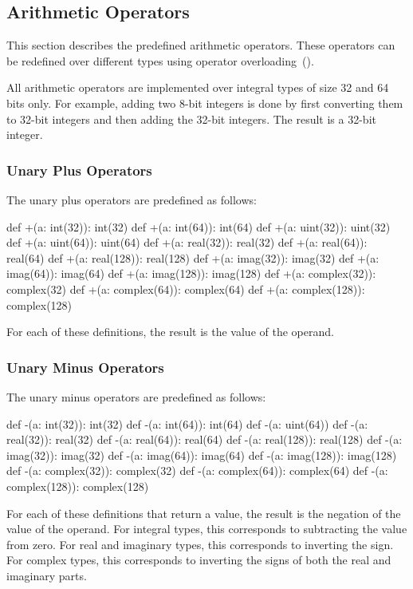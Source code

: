 \subsection{Arithmetic Operators}
\label{Arithmetic_Operators}

This section describes the predefined arithmetic operators.  These
operators can be redefined over different types using operator
overloading~().

All arithmetic operators are implemented over integral types of size
32 and 64 bits only.  For example, adding two 8-bit integers is done
by first converting them to 32-bit integers and then adding the 32-bit
integers.  The result is a 32-bit integer.

\subsubsection{Unary Plus Operators}
\label{Unary_Plus_Operators}

The unary plus operators are predefined as follows:
\begin{chapel}
def +(a: int(32)): int(32)
def +(a: int(64)): int(64)
def +(a: uint(32)): uint(32)
def +(a: uint(64)): uint(64)
def +(a: real(32)): real(32)
def +(a: real(64)): real(64)
def +(a: real(128)): real(128)
def +(a: imag(32)): imag(32)
def +(a: imag(64)): imag(64)
def +(a: imag(128)): imag(128)
def +(a: complex(32)): complex(32)
def +(a: complex(64)): complex(64)
def +(a: complex(128)): complex(128)
\end{chapel}
For each of these definitions, the result is the value of the operand.

\subsubsection{Unary Minus Operators}
\label{Unary_Minus_Operators}

The unary minus operators are predefined as follows:
\begin{chapel}
def -(a: int(32)): int(32)
def -(a: int(64)): int(64)
def -(a: uint(64))
def -(a: real(32)): real(32)
def -(a: real(64)): real(64)
def -(a: real(128)): real(128)
def -(a: imag(32)): imag(32)
def -(a: imag(64)): imag(64)
def -(a: imag(128)): imag(128)
def -(a: complex(32)): complex(32)
def -(a: complex(64)): complex(64)
def -(a: complex(128)): complex(128)
\end{chapel}
For each of these definitions that return a value, the result is the
negation of the value of the operand.  For integral types, this
corresponds to subtracting the value from zero.  For real and
imaginary types, this corresponds to inverting the sign.  For complex
types, this corresponds to inverting the signs of both the real and
imaginary parts.

